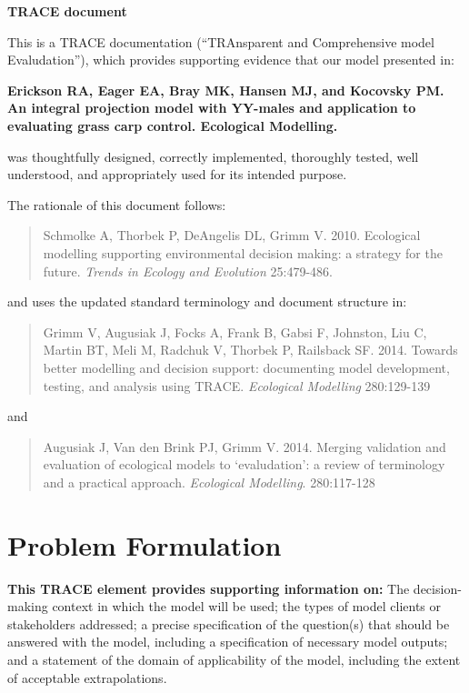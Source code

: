 \documentclass{article}[12pt]
\begin{document}
\begin{center}
\textbf{{\huge TRACE document}}
\end{center}

 This is a TRACE documentation (``TRAnsparent and Comprehensive model Evaludation''), 
which provides supporting evidence that our model presented in:
\begin{center}
\textbf{Erickson RA, Eager EA, Bray MK, Hansen MJ, and Kocovsky PM. An integral projection model with YY-males and application to evaluating grass carp control. Ecological Modelling.}
\end{center}
was thoughtfully designed, correctly implemented, thoroughly tested, well understood, and appropriately used for its intended purpose. 

 The rationale of this document follows: 
\begin{verse}
Schmolke A, Thorbek P, DeAngelis DL, Grimm V. 2010. Ecological modelling supporting environmental decision making: a strategy for the future. \textit{Trends in Ecology and Evolution} 25:479-486.
\end{verse}
and uses the updated standard terminology and document structure in:
\begin{verse}
Grimm V, Augusiak J, Focks A, Frank B, Gabsi F, Johnston, Liu C, Martin BT, Meli M, Radchuk V, Thorbek P, Railsback SF. 2014. Towards better modelling and decision support: documenting model development, testing, and analysis using TRACE. \textit{Ecological Modelling} 280:129-139
\end{verse}
and
\begin{verse}
Augusiak J, Van den Brink PJ, Grimm V. 2014. Merging validation and evaluation of ecological models to `evaludation': a review of terminology and a practical approach. \textit{Ecological Modelling}. 280:117-128
\end{verse}


\pagebreak

\tableofcontents

\pagebreak
\section{Problem Formulation}
\textbf{This TRACE element provides supporting information on:} The decision-making context in which the model will be used; the types of model clients or stakeholders addressed; a precise specification of the question(s) that should be answered with the model, including a specification of necessary model outputs; and a statement of the domain of applicability of the model, including the extent of acceptable extrapolations. 
\end{document}
